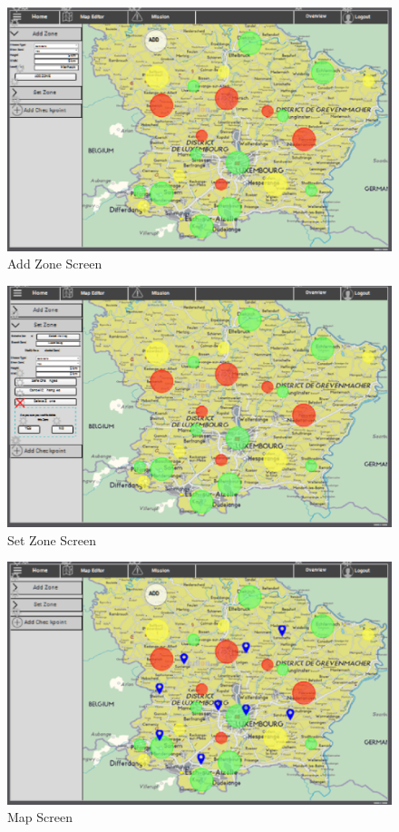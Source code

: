 \begin{figure}[htbp]
\begin{center}
 \caption{\label{fig:W10} Add Zone Screen}
   \includegraphics[width=150mm]{./images/Web/addzone.eps}
\end{center}
\end{figure}
\begin{figure}[htbp]
\begin{center}
 \caption{\label{fig:W11} Set Zone Screen}
   \includegraphics[width=150mm]{./images/Web/setzone.eps}
\end{center}
\end{figure}
\begin{figure}[htbp]
\begin{center}
 \caption{\label{fig:W9} Map Screen}
   \includegraphics[width=150mm]{./images/Web/map.eps}
\end{center}
\end{figure}
